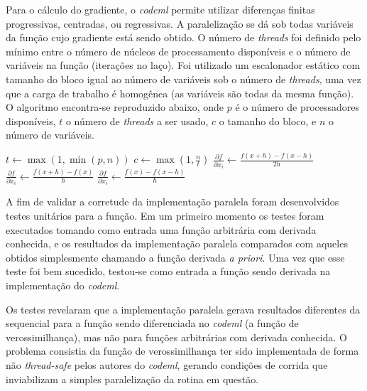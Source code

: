 \documentclass[cic,tc]{iiufrgs}
\begin{document}
Para o cálculo do gradiente, o \textit{codeml} permite utilizar diferenças finitas
progressivas, centradas, ou regressivas. A paralelização se dá sob todas
variáveis da função cujo gradiente está sendo obtido. O número de
\textit{threads} foi definido pelo mínimo entre o número de núcleos de
processamento disponíveis e o número de variáveis na função (iterações no
laço). Foi utilizado um escalonador estático com tamanho do bloco igual ao
número de variáveis sob o número de \textit{threads}, uma vez que a carga de
trabalho é homogênea (as variáveis são todas da mesma função). O algoritmo
encontra-se reproduzido abaixo, onde $p$ é o número de processadores
disponíveis, $t$ o número de \textit{threads} a ser usado, $c$ o tamanho do
bloco, e $n$ o número de variáveis.

\begin{algorithmic}
\State $t \gets \max(1, \min(p, n))$
\State $c \gets \max(1, \frac{n}{t})$
    \State $\frac{\partial f}{\partial x_i} \gets \frac{f(x+h)-f(x-h)}{2h}$
    \State $\frac{\partial f}{\partial x_i} \gets \frac{f(x+h)-f(x)}{h}$
  \Else
    \State $\frac{\partial f}{\partial x_i} \gets \frac{f(x)-f(x-h)}{h}$
  \EndIf
\EndFor
\end{algorithmic}

A fim de validar a corretude da implementação paralela foram desenvolvidos
testes unitários para a função. Em um primeiro momento os testes foram
executados tomando como entrada uma função arbitrária com derivada conhecida,
e os resultados da implementação paralela comparados com aqueles obtidos
simplesmente chamando a função derivada \textit{a priori}. Uma vez que esse
teste foi bem sucedido, testou-se como entrada a função sendo derivada na
implementação do \textit{codeml}.

Os testes revelaram que a implementação paralela gerava resultados diferentes
da sequencial para a função sendo diferenciada no \textit{codeml} (a função de
verossimilhança), mas não para funções arbitrárias com derivada conhecida. O
problema consistia da função de verossimilhança ter sido implementada de forma
não \textit{thread-safe} pelos autores do \textit{codeml}, gerando condições de corrida
que inviabilizam a simples paralelização da rotina em questão.
\end{document}
